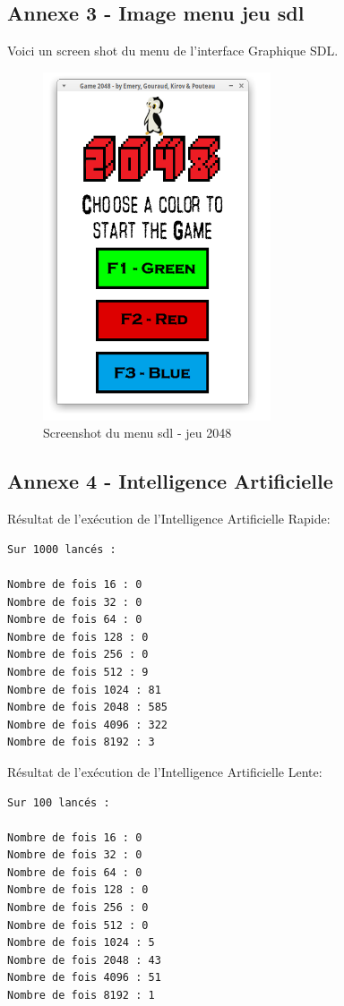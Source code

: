 \documentclass[a4paper]{article}
\begin{document}
\subsection{Annexe 3 - Image menu jeu sdl}
\label{sec-7-3}
\noindent
Voici un screen shot du menu de l'interface Graphique SDL.
\vspace{1.5cm}
\begin{figure}[h]
  \caption{Screenshot du menu sdl - jeu 2048}
  \centering
  \includegraphics{screenshot-menu-jeu-sdl.png}
\end{figure}

\newpage
\subsection{Annexe 4 - Intelligence Artificielle}
\label{sec-7-4}
\noindent
Résultat de l'exécution de l'Intelligence Artificielle Rapide:
\begin{verbatim}
Sur 1000 lancés :

Nombre de fois 16 : 0
Nombre de fois 32 : 0
Nombre de fois 64 : 0
Nombre de fois 128 : 0
Nombre de fois 256 : 0
Nombre de fois 512 : 9
Nombre de fois 1024 : 81
Nombre de fois 2048 : 585
Nombre de fois 4096 : 322
Nombre de fois 8192 : 3
\end{verbatim}

\noindent
Résultat de l'exécution de l'Intelligence Artificielle Lente:
\begin{verbatim}
Sur 100 lancés : 

Nombre de fois 16 : 0
Nombre de fois 32 : 0
Nombre de fois 64 : 0
Nombre de fois 128 : 0
Nombre de fois 256 : 0
Nombre de fois 512 : 0
Nombre de fois 1024 : 5
Nombre de fois 2048 : 43
Nombre de fois 4096 : 51
Nombre de fois 8192 : 1
\end{verbatim}
\end{document}
